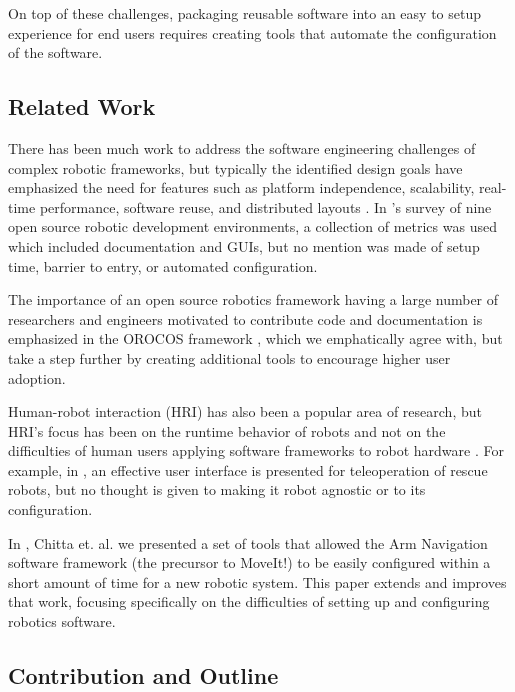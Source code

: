 \documentclass[10pt,journal,compsoc]{joser1}
\begin{document}
{On top of these challenges, packaging reusable software into an easy to setup experience for end users requires creating tools that automate the configuration of the software.

\subsection{Related Work}

There has been much work to address the software engineering challenges of
complex robotic frameworks, but typically the identified design goals have
emphasized the need for features such as platform independence, scalability,
real-time performance, software reuse, and distributed layouts
\cite{realtime_framework, collett2005player, kramer2007development}. In
\cite{kramer2007development}'s survey of nine open source robotic development
environments, a collection of metrics was used which included documentation and
GUIs, but no mention was made of setup time, barrier to entry, or automated
configuration.

The importance of an open source robotics framework having a large number of
researchers and engineers motivated to contribute code and documentation is
emphasized in the OROCOS framework \cite{bruyninckx2001open}, which we
emphatically agree with, but take a step further by creating additional tools to
encourage higher user adoption.
  
Human-robot interaction (HRI) has also been a popular area of research, but
HRI's focus has been on the runtime behavior of robots and not on the
difficulties of human users applying software frameworks to robot hardware
\cite{hci_metrics, yancotaxonomy, goodrichseven}. For example, in
\cite{rescueRobots}, an effective user interface is presented for teleoperation
of rescue robots, but no thought is given to making it robot agnostic or to its
configuration. 

In \cite{chitta2012perception}, Chitta et. al. we presented a set of tools that
allowed the Arm Navigation software framework (the precursor to MoveIt!) to be
easily configured within a short amount of time for a new robotic system. This
paper extends and improves that work, focusing specifically on the difficulties
of setting up and configuring robotics software.

\subsection{Contribution and Outline}

}
\end{document}
